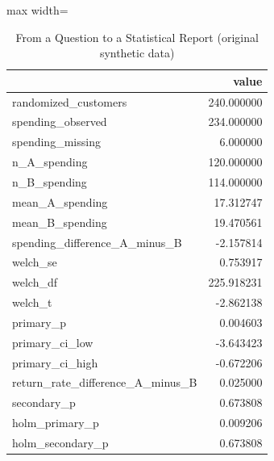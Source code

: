 \begin{table}[htbp]
\centering
\caption{From a Question to a Statistical Report (original synthetic data)}
\begingroup
\small
\setlength{\tabcolsep}{6pt}
\renewcommand{\arraystretch}{1.12}
\begin{adjustbox}{max width=\linewidth}
\begin{tabular}{@{}lr@{}}
\toprule
 & value \\
\midrule
randomized\_customers & 240.000000 \\
spending\_observed & 234.000000 \\
spending\_missing & 6.000000 \\
n\_A\_spending & 120.000000 \\
n\_B\_spending & 114.000000 \\
mean\_A\_spending & 17.312747 \\
mean\_B\_spending & 19.470561 \\
spending\_difference\_A\_minus\_B & -2.157814 \\
welch\_se & 0.753917 \\
welch\_df & 225.918231 \\
welch\_t & -2.862138 \\
primary\_p & 0.004603 \\
primary\_ci\_low & -3.643423 \\
primary\_ci\_high & -0.672206 \\
return\_rate\_difference\_A\_minus\_B & 0.025000 \\
secondary\_p & 0.673808 \\
holm\_primary\_p & 0.009206 \\
holm\_secondary\_p & 0.673808 \\
\bottomrule
\end{tabular}
\end{adjustbox}
\endgroup
\end{table}